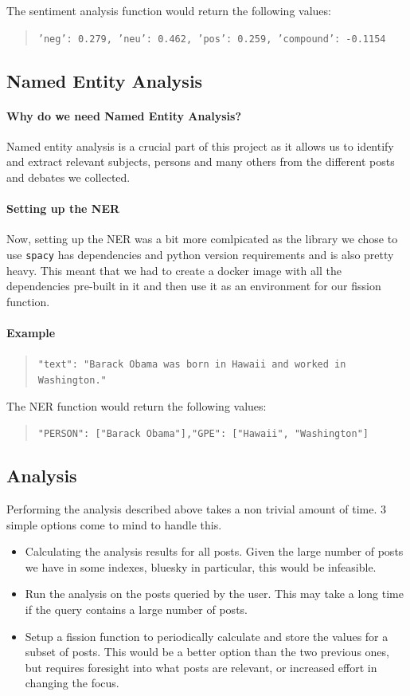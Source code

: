 \documentclass[]{article}
\numberwithin{equation}{section}
\begin{document}
The sentiment analysis function would return the following values:
\begin{quote}
    \texttt{'neg': 0.279, 'neu': 0.462, 'pos': 0.259, 'compound': -0.1154}
\end{quote}

\subsection*{Named Entity Analysis}
\paragraph*{Why do we need Named Entity Analysis?}
Named entity analysis is a crucial part of this project as it allows us to identify and extract relevant subjects, persons and many others from the different posts and debates we collected.

\paragraph*{Setting up the NER}
Now, setting up the NER was a bit more comlpicated as the library we chose to use \texttt{spacy} has dependencies and python version requirements and is also pretty heavy.
This meant that we had to create a docker image with all the dependencies pre-built in it and then use it as an environment for our fission function.

\paragraph*{Example}
\begin{quote}
    \texttt{"text": "Barack Obama was born in Hawaii and worked in Washington."}
\end{quote}
The NER function would return the following values:
\begin{quote}
    \texttt{{"PERSON": ["Barack Obama"],"GPE": ["Hawaii", "Washington"]}}
\end{quote}

\subsection*{Analysis}

Performing the analysis described above takes a non trivial amount of time. 
3 simple options come to mind to handle this.

\begin{itemize}
    \item Calculating the analysis results for all posts. 
        Given the large number of posts we have in some indexes, bluesky in particular, this would be infeasible.
    \item Run the analysis on the posts queried by the user. 
        This may take a long time if the query contains a large number of posts.
    \item Setup a fission function to periodically calculate and store the values for a subset of posts.
        This would be a better option than the two previous ones, but requires foresight into what posts are relevant, or increased effort in changing the focus.
\end{itemize}
\end{document}
